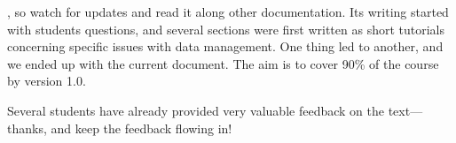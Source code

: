 , so watch for updates and read it along other documentation. Its writing started with students questions, and several sections were first written as short tutorials concerning specific issues with data management. One thing led to another, and we ended up with the current document. The aim is to cover 90\% of the course by version 1.0.%

	Several students have already provided very valuable feedback on the text—thanks, and keep the feedback flowing in!%